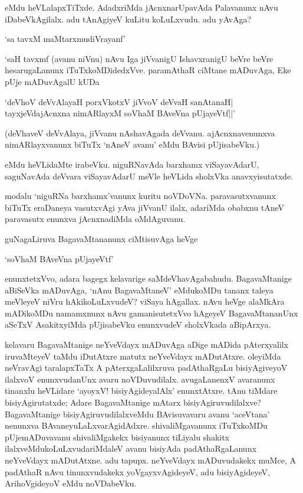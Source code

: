 \noindent eMdu heVLalapxTiTxde. AdadxriMda jAcnxnarUpavAda Palavanunx nAvu iDabeVkAgilalx. adu tAnAgiyeV kuLitu koLuLxvudu. adu yAvAga?

\begin{shloka}
`sa tavxM maMtarxmudiVrayanf'
\end{shloka}

`saH tavxmf (avanu niVnu) nAvu Iga jiVvanigU IshavxranigU beVre beVre hesarugaLanunx iTuTxkoMDidedxVve. paramAthaR ciMtane mADuvAga, Eke pUje mADuvAgalU kUDa

\begin{shloka}
`deVhoV deVvAlayaH porxVkotxV jiVvoV deVvaH sanAtanaH|\\
tayxjeVdajAcnxna nimARlayxM soV\s haM BAveVna pUjayeVtf||'
\end{shloka}

(deVhaveV deVvAlaya, jiVvanu nAshavAgada deVvanu. ajAcnxnavenunxva nimARlayxvanunx biTuTx `nAneV avanu' eMdu BAvisi pUjisabeVku.)

eMdu heVLidaMte irabeVku. niguRNavAda barxhamx viSayavAdarU, saguNavAda deVvara viSayavAdarU meVle heVLida sholxVka anavxyisutatxde.

modalu `niguRNa barxhamx'vanunx kuritu noVDoVNa. paravasutxvanunx biTuTx eraDaneya vasutxvAgi yAva jiVvanU ilalx, adariMda obabxnu tAneV paravasutx enunxva jAcnxnadiMda oMdAguvanu.

guNagaLiruva BagavaMtananunx ciMtisuvAga heVge

\begin{shloka}
`soV\s haM BAveVna pUjayeVtf'
\end{shloka}

\noindent enunxtetxVvo, adara bagegx kelavarige saMdeVhavAgabahudu. BagavaMtanige aBiSeVka mADuvAga, `nAnu BagavaMtaneV' eMdukoMDu tananx taleya meVleyeV niVru hAkikoLuLxvudeV? viSaya hAgallax. nAvu heVge alaMkAra mADikoMDu namamxnunx nAvu gamanisutetxVvo hAgeyeV BagavaMtananUnx aSeTxV AsakitxyiMda pUjisabeVku enunxvudeV sholxVkada aBipArxya.

kelavaru BagavaMtanige neYveVdayx mADuvAga aDige mADida pAterxyalilx iruvaMteyeV taMdu iDutAtxre matutx neYveVdayx mADutAtxre. oleyiMda neVravAgi taralapxTaTx A pAterxgaLalilxruva padAthaRgaLu bisiyAgiveyoV ilalxvoV enunxvudanUnx avaru noVDuvudilalx. avugaLanenxV avaranunx tinanxlu heVLidare `ayoyxV! bisiyAgideyalAlx' enunxtAtxre. tAnu tiMdare bisiyAgirutatxde; Adare BagavaMtanige mAtarx bisiyAgiruvudilalxve? BagavaMtanige bisiyAgiruvudilalxveMdu BAvisuvavaru avanu `aceVtana' nenunxva BAvaneyuLaLxvarAgidAdxre. shivaliMgavanunx iTuTxkoMDu pUjemADuvavanu shivaliMgakekx bisiyanunx tiLiyalu shakitx ilalxveMdukoLuLxvudariMdaleV avanu bisiyAda padAthaRgaLanunx neYveVdayx mADutAtxne. adu tapupx. neYveVdayx mADuvudakekx muMce, A padAthaR nAvu tinunxvudakekx yoVgayxvAgideyeV, adu bisiyAgideyeV, ArihoVgideyoV eMdu noVDabeVku.

